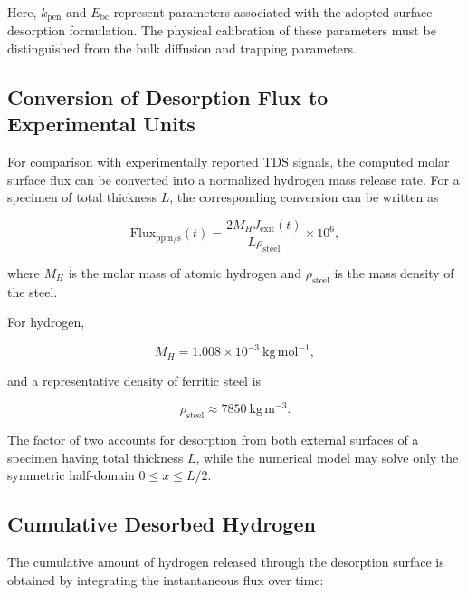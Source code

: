 Here, $k_{\mathrm{pen}}$ and $E_{\mathrm{bc}}$ represent parameters
associated with the adopted surface desorption formulation. The
physical calibration of these parameters must be distinguished from
the bulk diffusion and trapping parameters.

\subsection{Conversion of Desorption Flux to Experimental Units}
\label{subsec:flux_conversion}

For comparison with experimentally reported TDS signals, the computed
molar surface flux can be converted into a normalized hydrogen mass
release rate. For a specimen of total thickness $L$, the corresponding
conversion can be written as

\begin{equation}
\mathrm{Flux}_{\mathrm{ppm/s}}(t)
=
\frac{
2M_HJ_{\mathrm{exit}}(t)
}{
L\rho_{\mathrm{steel}}
}
\times10^6,
\label{eq:ch3_flux_ppm_conversion}
\end{equation}

where $M_H$ is the molar mass of atomic hydrogen and
$\rho_{\mathrm{steel}}$ is the mass density of the steel.

For hydrogen,

\begin{equation}
M_H
=
1.008\times10^{-3}
\ \mathrm{kg\,mol^{-1}},
\label{eq:ch3_MH}
\end{equation}

and a representative density of ferritic steel is

\begin{equation}
\rho_{\mathrm{steel}}
\approx
7850\ \mathrm{kg\,m^{-3}}.
\label{eq:ch3_rho}
\end{equation}

The factor of two accounts for desorption from both external surfaces
of a specimen having total thickness $L$, while the numerical model
may solve only the symmetric half-domain $0\leq x\leq L/2$.

\subsection{Cumulative Desorbed Hydrogen}
\label{subsec:cumulative_desorption}

The cumulative amount of hydrogen released through the desorption
surface is obtained by integrating the instantaneous flux over time:

